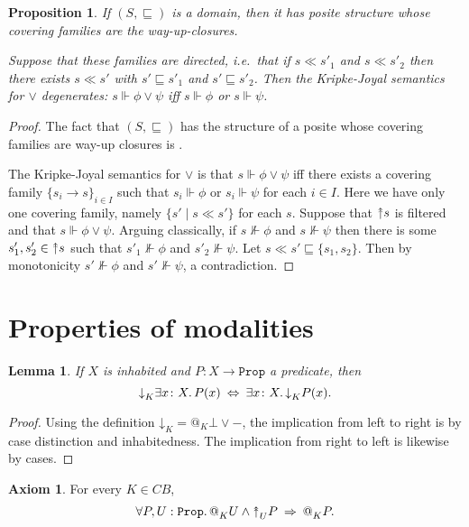 \documentclass[11pt, oneside, article]{memoir}
\makeatletter
\theoremstyle{plain}
\newtheorem{proposition}[theorem]{Proposition}
\newtheorem{lemma}[theorem]{Lemma}
\theoremstyle{definition}
\newtheorem{axiom}{Axiom}
\theoremstyle{remark}
\newcommand{\const}[1]{\mathtt{#1}}
\newcommand{\Prop}{\const{Prop}}
\newcommand{\BaseSpace}{B}
\newcommand{\AtSymbol}{{@}}
\newcommand{\SeeSymbol}{{\down}}  %
\newcommand{\InSymbol}{{\upclose}}%
\newcommand{\At}[2][]{\AtSymbol^{#1}_{#2}}
\newcommand{\See}[2][]{\SeeSymbol^{#1}_{#2}}
\newcommand{\In}[2][]{\InSymbol^{#1}_{#2}}
\newcommand{\sqss}{\sqsubseteq}
\newcommand{\upclose}{{\rotatebox[origin=c]{90}{$\twoheadrightarrow$}}}
\newcommand{\down}{\mathord{\downarrow}}
\newcommand{\imp}{\Rightarrow}
\makeatother
\begin{document}
\begin{proposition}
If $(S,\sqss)$ is a domain, then it has posite structure whose covering families are the way-up-closures.

Suppose that these families are directed, i.e.\ that if $s\ll s'_1$ and $s\ll s'_2$ then there exists $s\ll s'$ with $s'\sqss s'_1$ and $s'\sqss s'_2$. Then the Kripke-Joyal semantics for $\vee$ degenerates: $s\Vdash\phi\vee\psi$ iff $s\Vdash\phi$ or $s\Vdash\psi$.
\end{proposition}
\begin{proof}
The fact that $(S,\sqss)$ has the structure of a posite whose covering families are way-up closures is \cite[Remark 2.21]{Schultz.Spivak:2017a}.

The Kripke-Joyal semantics for $\vee$ is that $s\Vdash\phi\vee\psi$ iff there exists a covering family $\{s_i\to s\}_{i\in I}$ such that $s_i\Vdash\phi$ or $s_i\Vdash\psi$ for each $i\in I$. Here we have only one covering family, namely $\{s'\mid s\ll s'\}$ for each $s$. Suppose that $\upclose s$ is filtered and that $s\Vdash\phi\vee\psi$. Arguing classically, if $s\not\Vdash\phi$ and $s\not\Vdash\psi$ then there is some $s'_1,s'_2\in\upclose s$ such that $s'_1\not\Vdash\phi$ and $s'_2\not\Vdash\psi$. Let $s\ll s'\sqss \{s_1,s_2\}$. Then by monotonicity $s'\not\Vdash\phi$ and $s'\not\Vdash\psi$, a contradiction.
\end{proof}


\section{Properties of modalities}

\begin{lemma}
If $X$ is inhabited and $P : X \to \Prop$ a predicate, then
\[
	\See{K} \exists x \colon X \ldotp P(x) \: \Leftrightarrow \: \exists x \colon X \ldotp \See{K} P(x).
\]
\label{lem.see_vs_exists}
\end{lemma}

\begin{proof}
Using the definition $\See{K} = \At{K} \bot \vee -$, the implication from left to right is by case distinction and inhabitedness. The implication from right to left is likewise by cases.
\end{proof}

\begin{axiom}\label{ax.atvsin}
For every $K\in C\BaseSpace$,
\[
	\forall P,U : \Prop \ldotp \At{K} U \wedge \In{U} P \: \imp \: \At{K} P.
\]
\end{axiom}
\end{document}
